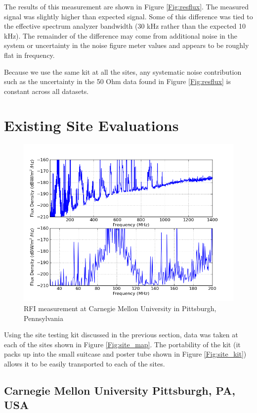 The results of this measurement are shown in Figure \ref{Fig:resflux}. The measured signal was slightly higher than expected signal. Some of this difference was tied to the effective spectrum analyzer bandwidth (30 kHz rather than the expected 10 kHz). The remainder of the difference may come from additional noise in the system or uncertainty in the noise figure meter values and appears to be roughly flat in frequency. 

Because we use the same kit at all the sites, any systematic noise contribution such as the uncertainty in the 50 Ohm data found in Figure \ref{Fig:resflux} is constant across all datasets. 

\section{Existing Site Evaluations}

\begin{figure}[tb]
\begin{center}
\includegraphics[width=0.9\linewidth]{RFI_testing/figures/Pittsburgh_cal.png}
\caption{RFI measurement at Carnegie Mellon University in Pittsburgh, Pennsylvania}
\label{Fig:pghcal}
\end{center}
\end{figure}


Using the site testing kit discussed in the previous section, data was taken at each of the sites shown in Figure \ref{Fig:site_map}. The portability of the kit (it packs up into the small suitcase and poster tube shown in Figure \ref{Fig:site_kit}) allows it to be easily transported to each of the sites. 

\subsection{Carnegie Mellon University Pittsburgh, PA, USA}

